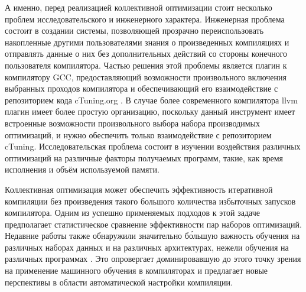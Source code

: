 А именно, перед реализацией коллективной оптимизации стоит несколько проблем исследовательского и инженерного характера. Инженерная проблема состоит в создании системы, позволяющей прозрачно переиспользовать накопленные другими пользователями знания о произведенных компиляциях и отправлять данные о них без дополнительных действий со стороны конечного пользователя компилятора. Частью решения этой проблемы является плагин к компилятору GCC, предоставляющий возможности произвольного включения выбранных проходов компилятора и обеспечивающий его взаимодействие с репозиторием кода cTuning.org \cite{Fur2009}. В случае более современного компилятора llvm \cite{llvm} плагин имеет более простую организацию, поскольку данный инструмент имеет встроенные возможности произвольного выбора набора производимых оптимизаций, и нужно обеспечить только взаимодействие с репозиторием cTuning. Исследовательская проблема состоит в изучении воздействия различных оптимизаций на различные факторы получаемых программ, такие, как время исполнения и объём используемой памяти.

Коллективная оптимизация может обеспечить эффективность итеративной компиляции без произведения такого большого количества избыточных запусков компилятора. Одним из успешно применяемых подходов к этой задаче предполагает статистическое сравнение эффективности пар наборов оптимизаций. Недавние работы также обнаружили значительно б\'{о}льшую важность обучения на различных наборах данных и на различных архитектурах, нежели обучения на различных программах \cite{springerlink:10.1007/11596110:24}. Это опровергает доминировавшую до этого точку зрения на применение машинного обучения в компиляторах и предлагает новые перспективы в области автоматической настройки компиляции.